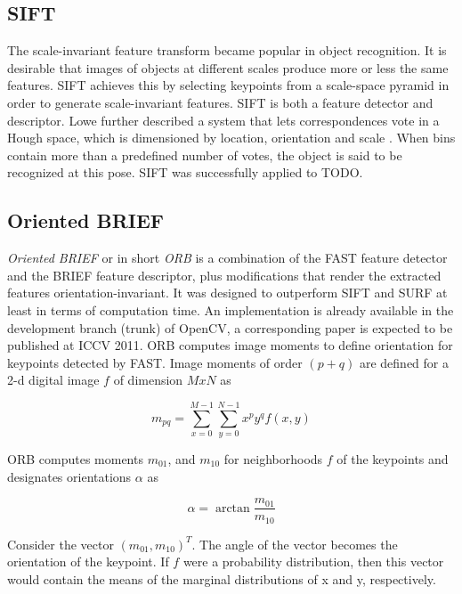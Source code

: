 \subsection{SIFT}

The scale-invariant feature transform became popular in object recognition.  It
is desirable that images of objects at different scales produce more or less
the same features. SIFT achieves this by selecting keypoints from a scale-space
pyramid in order to generate scale-invariant features. SIFT is both a feature
detector and descriptor. Lowe further described a system that lets
correspondences vote in a Hough space, which is dimensioned by location,
orientation and scale \cite{Lowe1999}. When bins contain more than a predefined
number of votes, the object is said to be recognized at this pose.  SIFT was
successfully applied to TODO.

\subsection{Oriented BRIEF}

{\it Oriented BRIEF} or in short {\it ORB} is a combination of the FAST feature
detector and the BRIEF feature descriptor, plus modifications that render the
extracted features orientation-invariant. It was designed to outperform SIFT
and SURF at least in terms of computation time. An implementation is already
available in the development branch (trunk) of OpenCV, a corresponding paper is
expected to be published at ICCV 2011. ORB computes image moments to define 
orientation for keypoints detected by FAST. Image moments of order $(p + q)$ are
defined for a 2-d digital image $f$ of dimension $MxN$ as

\begin{equation}
    m_{pq} = \sum_{x=0}^{M-1} \sum_{y=0}^{N-1} x^p y^q f(x, y)
\end{equation}

ORB computes moments $m_{01}$, and $m_{10}$ for neighborhoods $f$ of the keypoints
and designates orientations $\alpha$ as

\begin{equation}
    \alpha = \arctan \frac{m_{01}}{m_{10}}
\end{equation}

Consider the vector $\left( m_{01}, m_{10}\right)^T$. The angle of the vector
becomes the orientation of the keypoint. If $f$ were a probability
distribution, then this vector would contain the means of the marginal
distributions of x and y, respectively.

